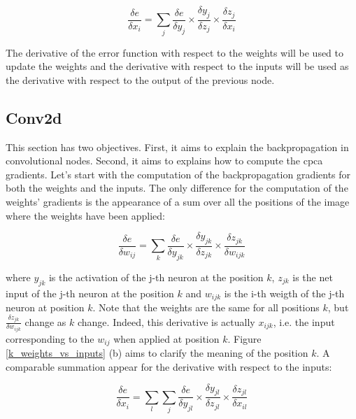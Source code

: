 \documentclass[11pt]{report}
\begin{document}
\begin{equation}
\frac{\delta e}{\delta x_{i}} = \sum_{j} \frac{\delta e}{\delta y_j} \times \frac{\delta y_j}{\delta z_j} \times \frac{\delta z_j}{\delta x_i}
\end{equation}

\noindent The derivative of the error function with respect to the weights will be used to update the weights and the derivative with respect to the inputs will be used as the derivative with respect to the output of the previous node.

\subsection{Conv2d} \label{sec:conv2d}

This section has two objectives. First, it aims to explain the backpropagation in convolutional nodes. Second, it aims to explains how to compute the \acrshort{cpca} gradients. Let's start with the computation of the backpropagation gradients for both the weights and the inputs. The only difference for the computation of the weights' gradients is the appearance of a sum over all the positions of the image where the weights have been applied:

\begin{equation} \label{eq:dwc2d}
\frac{\delta e}{\delta w_{ij}} = \sum_{k} \frac{\delta e}{\delta y_{jk}} \times \frac{\delta y_{jk}}{\delta z_{jk}} \times \frac{\delta z_{jk}}{\delta w_{ijk}}
\end{equation}

\noindent where $y_{jk}$ is the activation of the j-th neuron at the position $k$, $z_{jk}$ is the net input of the j-th neuron at the position $k$ and $w_{ijk}$ is the i-th weigth of the j-th neuron at position $k$. Note that the weights are the same for all positions $k$, but $\frac{\delta z_{jk}}{\delta w_{ijk}}$ change as $k$ change. Indeed, this derivative is actually $x_{ijk}$, i.e. the input corresponding to the $w_{ij}$ when applied at position $k$. Figure \ref{k_weights_vs_inputs} (b) aims to clarify the meaning of the position $k$. A comparable summation appear for the derivative with respect to the inputs:

\begin{equation}
\frac{\delta e}{\delta x_{i}} = \sum_{l} \sum_{j} \frac{\delta e}{\delta y_{jl}} \times \frac{\delta y_{jl}}{\delta z_{jl}} \times \frac{\delta z_{jl}}{\delta x_{il}}
\end{equation}
\end{document}
